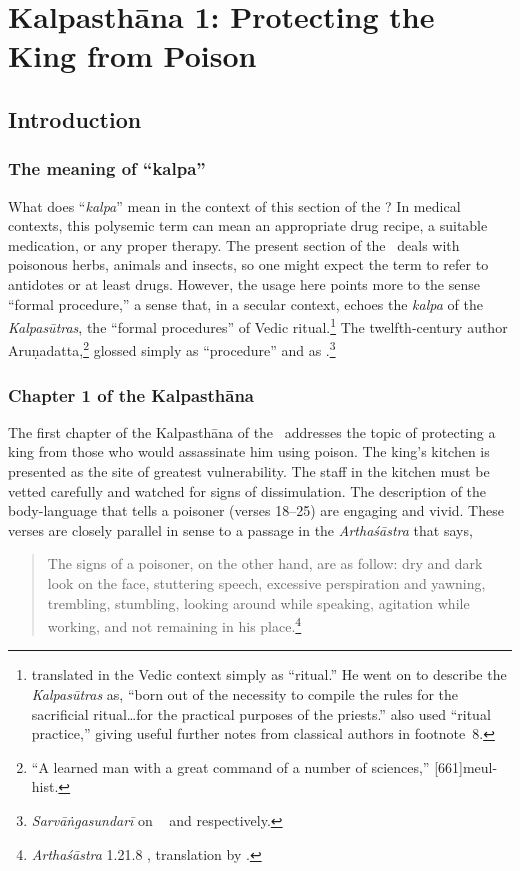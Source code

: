 \chapter{Kalpasthāna 1: Protecting the King from Poison}

\section{Introduction}

\subsection{The meaning of “kalpa”}

What does “\emph{kalpa}” mean in the context of this section of the
\SS? In medical contexts, this polysemic term can mean an appropriate
drug recipe, a suitable medication, or any proper therapy.  The
present section of the \SS\ deals with poisonous herbs, animals and
insects, so one might expect the term to refer to antidotes or at
least drugs. However, the usage here points more to the sense
“formal procedure,”  a sense that, in a secular context, echoes the
\emph{kalpa} of the \emph{Kalpasūtras}, the “formal procedures” of
Vedic ritual.\footnote{\citet[252]{wint-1981} translated 
    in the Vedic context simply as “ritual.”  He went on to describe the
    \emph{Kalpasūtras} as, “born out of the necessity to compile the
rules for
    the sacrificial ritual\ldots for the practical purposes of the
    priests.” \citet[467]{gond-1977} also used “ritual practice,” giving
    useful  further notes from classical authors in footnote~8.}
The twelfth-century author Aruṇadatta,\footnote{“A learned man with a great
command of a number of sciences,” [661]{meul-hist}.}
glossed  simply as  “procedure”  and as
.\footnote{\emph{Sarvāṅgasundarī} on \AH\
     and  
    respectively.}


\subsection{Chapter 1 of the Kalpasthāna}
The first chapter of the Kalpasthāna of the \SS\
addresses the topic of protecting a king from those who would
assassinate him using poison. The king's kitchen is presented as the
site of greatest vulnerability.  The staff in the kitchen must be
vetted carefully and watched for signs of dissimulation.  The
description of the body-language that tells a poisoner (verses 18--25)
are engaging and vivid.  These verses are closely parallel in sense to
a passage in the \emph{Arthaśāstra} that says,
\begin{quote}
    The signs of a poisoner, on the other hand, are as follow: dry and
dark look on the face, stuttering speech, excessive perspiration
and yawning, trembling, stumbling, looking around while speaking,
agitation while working, and not remaining in his
place.\footnote{\emph{Arthaśāstra} 1.21.8 \citep[1,
    30]{kang-1969}, translation by \citet[97]{oliv-2013}.}
\end{quote}

